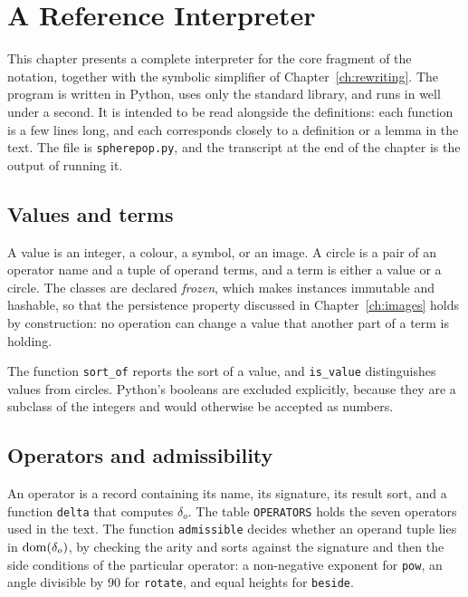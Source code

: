 \chapter{A Reference Interpreter}
\label{ch:interpreter}

This chapter presents a complete interpreter for the core fragment of the notation, together with the symbolic simplifier of Chapter~\ref{ch:rewriting}. The program is written in Python, uses only the standard library, and runs in well under a second. It is intended to be read alongside the definitions: each function is a few lines long, and each corresponds closely to a definition or a lemma in the text. The file is \texttt{spherepop.py}, and the transcript at the end of the chapter is the output of running it.

\section{Values and terms}

A value is an integer, a colour, a symbol, or an image. A circle is a pair of an operator name and a tuple of operand terms, and a term is either a value or a circle. The classes are declared \emph{frozen}, which makes instances immutable and hashable, so that the persistence property discussed in Chapter~\ref{ch:images} holds by construction: no operation can change a value that another part of a term is holding.



The function \texttt{sort\_of} reports the sort of a value, and \texttt{is\_value} distinguishes values from circles. Python's booleans are excluded explicitly, because they are a subclass of the integers and would otherwise be accepted as numbers.

\section{Operators and admissibility}

An operator is a record containing its name, its signature, its result sort, and a function \texttt{delta} that computes $\delta_o$. The table \texttt{OPERATORS} holds the seven operators used in the text. The function \texttt{admissible} decides whether an operand tuple lies in $\operatorname{dom}(\delta_o)$, by checking the arity and sorts against the signature and then the side conditions of the particular operator: a non-negative exponent for \texttt{pow}, an angle divisible by $90$ for \texttt{rotate}, and equal heights for \texttt{beside}.

